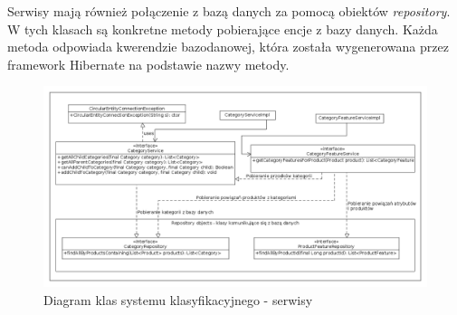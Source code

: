 Serwisy mają również połączenie z bazą danych za pomocą obiektów \textit{repository}. W tych klasach są konkretne metody pobierające encje z bazy danych. Każda metoda odpowiada kwerendzie bazodanowej, która została wygenerowana przez framework Hibernate na podstawie nazwy metody. 
\begin{figure}
	\begin{center}
		\includegraphics[scale=0.38]{klasy_serwisy_sysKlas.png}
	\end{center}
	\caption{{\color{black}Diagram klas systemu klasyfikacyjnego - serwisy}} \label{klasy_serwisy_sysKlas}
\end{figure}

